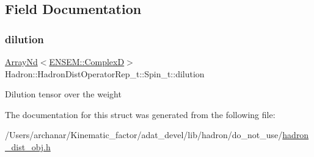 \subsection{Field Documentation}
\mbox{\label{structHadron_1_1HadronDistOperatorRep__t_1_1Spin__t_a848b37978200587c937b56cc52234b1c}} 
\subsubsection{\texorpdfstring{dilution}{dilution}}
{\footnotesize\ttfamily \mbox{\hyperlink{classADAT_1_1ArrayNd}{Array\+Nd}}$<$\mbox{\hyperlink{group__defs_gaf38ee8c84f090ee0c3b76e7a384fb316}{E\+N\+S\+E\+M\+::\+ComplexD}}$>$ Hadron\+::\+Hadron\+Dist\+Operator\+Rep\+\_\+t\+::\+Spin\+\_\+t\+::dilution}

Dilution tensor over the weight 

The documentation for this struct was generated from the following file\+:\begin{DoxyCompactItemize}
\item 
/\+Users/archanar/\+Kinematic\+\_\+factor/adat\+\_\+devel/lib/hadron/do\+\_\+not\+\_\+use/\mbox{\hyperlink{hadron__dist__obj_8h}{hadron\+\_\+dist\+\_\+obj.\+h}}\end{DoxyCompactItemize}
